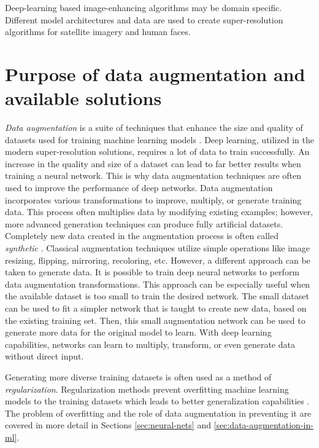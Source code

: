 Deep-learning based image-enhancing algorithms may be domain specific.
Different model architectures and data are used to create super-resolution algorithms for satellite imagery and human faces.

\section{Purpose of data augmentation and available solutions}
\label{sec:augmentation-introduction}
\textit{Data augmentation} is a suite of techniques that enhance the size and quality of datasets used for training machine learning models \cite{perez-2017-augmentation} \cite{mikolajczyk-2018-augmentation}.
Deep learning, utilized in the modern super-resolution solutions, requires a
lot of data to train successfully.
An increase in the quality and size of a dataset can lead to far better results when
training a neural network.
This is why data augmentation techniques are often used to improve the performance of deep networks.
Data augmentation incorporates various transformations to improve, multiply, or
generate training data.
This process often multiplies data by modifying existing examples; however, more advanced generation techniques can produce fully artificial datasets.
Completely new data created in the augmentation process is often called \textit{synthetic} \cite{nikolenko-2021-synthetic}.
Classical augmentation techniques utilize simple operations like image resizing, flipping, mirroring, recoloring, etc.
However, a different approach can be taken to generate data.
It is possible to train deep neural networks to perform data augmentation
transformations.
This approach can be especially useful when the available dataset is too small to train the desired network.
The small dataset can be used to fit a simpler network that is taught to create new data, based on the existing training set.
Then, this small augmentation network can be used to generate more data for the
original model to learn.
With deep learning capabilities, networks can learn to multiply, transform, or
even generate data without direct input.

Generating more diverse training datasets is often used as a method of \textit{regularization}.
Regularization methods prevent overfitting machine learning models to the training datasets which leads to better generalization capabilities \cite{kukacka2017regularization}.
The problem of overfitting and the role of data augmentation in preventing it are covered in more detail in Sections \ref{sec:neural-nets} and \ref{sec:data-augmentation-in-ml}.

